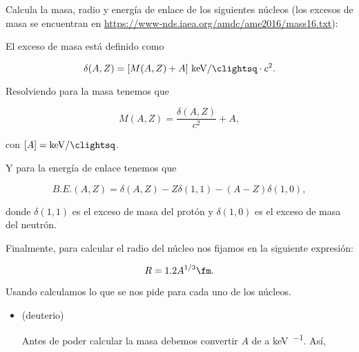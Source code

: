 \documentclass[./../main.tex]{subfiles}
\begin{document}
    \begin{exercise}
        Calcula la masa, radio y energía de enlace de los siguientes núcleos (los excesos de masa se encuentran en \url{https://www-nds.iaea.org/amdc/ame2016/mass16.txt}):

		\begin{solution}
            El exceso de masa está definido como

			\begin{equation*}
				\delta(A, Z) = \qty[parse-numbers=false]{\left[M(A, Z) + A\right]}{\keV\per\clightsq} \cdot c^{2}.
			\end{equation*}

			Resolviendo para la masa tenemos que

            \begin{equation}
                M(A, Z) = \dfrac{\delta(A, Z)}{c^{2}} + A,
                \label{eq:nuclearMasss}
            \end{equation}

            con \([A] = \unit{\keV\per\clightsq}\).

            Y para la energía de enlace tenemos que

            \begin{equation}
                B.E.(A, Z) = \delta(A, Z) - Z\delta(1, 1) - (A - Z)\delta(1, 0),
                \label{eq:bindingEnergy}
            \end{equation}

            donde \(\delta(1, 1)\) es el exceso de masa del protón y \(\delta(1, 0)\) es el exceso de masa del neutrón.

            Finalmente, para calcular el radio del núcleo nos fijamos en la siguiente expresión:

            \begin{equation}
                R = 1.2 A^{1/3} \unit{\fm}.
                \label{eq:nuclearRadius}
            \end{equation}

            Usando  calculamos lo que se nos pide para cada uno de los núcleos.
            
		\begin{itemize}
			\item {} (deuterio)

                    Antes de poder calcular la masa debemos convertir \(A\) de \unit{\uma} a \unit{\keV\per\clightsq}. Así,


\end{itemize}
\end{solution}
\end{exercise}
\end{document}
